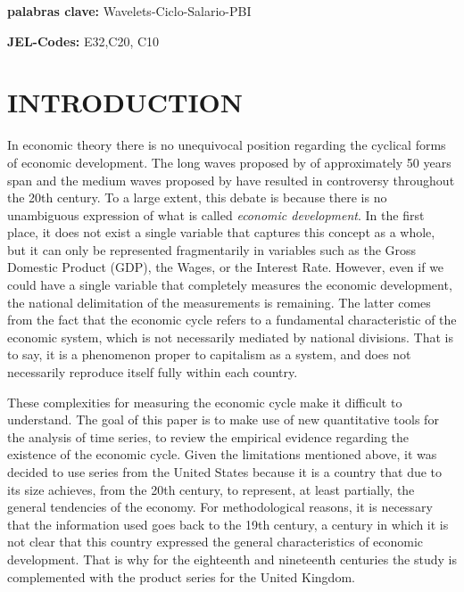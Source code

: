 \documentclass[a4paper,10cpi]{article}
\begin{document}
	
	\textbf{palabras clave:} Wavelets-Ciclo-Salario-PBI
	
	\textbf{JEL-Codes:} E32,C20, C10
	
	
	
	\pagebreak
	
	
	\section{\uppercase{\textbf{\normalsize{Introduction}}}}
	
	In economic theory there is no unequivocal position regarding the cyclical forms of economic development. The long waves proposed by \cite{kondratieff1979long} of approximately 50 years span and the medium waves proposed by \cite{kuznets1930secular} have resulted in controversy throughout the 20th century. To a large extent, this debate is because there is no unambiguous expression of what is called \textit{economic development}. In the first place, it does not exist a single variable that captures this concept as a whole, but it can only be represented fragmentarily in variables such as the Gross Domestic Product (GDP), the Wages, or the Interest Rate. However, even if we could have a single variable that completely measures the economic development, the national delimitation of the measurements is remaining. The latter comes from the fact that the economic cycle refers to a fundamental characteristic of the economic system, which is not necessarily mediated by national divisions. That is to say, it is a phenomenon proper to capitalism as a system, and does not necessarily reproduce itself fully within each country.
	
	
	These complexities for measuring the economic cycle make it difficult to understand. The goal of this paper is to make use of new quantitative tools for the analysis of time series, to review the empirical evidence regarding the existence of the economic cycle. Given the limitations mentioned above, it was decided to use series from the United States because it is a country that due to its size achieves, from the 20th century, to represent, at least partially, the general tendencies of the economy. For methodological reasons, it is necessary that the information used goes back to the 19th century, a century in which it is not clear that this country expressed the general characteristics of economic development. That is why for the eighteenth and nineteenth centuries the study is complemented with the product series for the United Kingdom.
	
\end{document}
